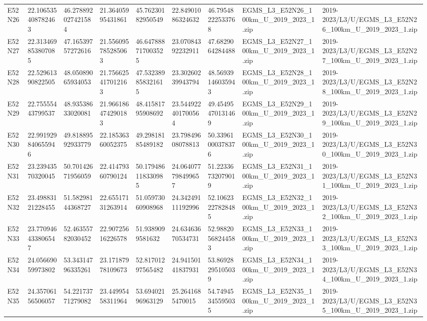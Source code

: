\begin{landscape}
\begin{longtable}{lllllllll}
E52N26 & 22.106535408782463 & 46.278892027421584 & 21.36405995431861 & 45.76230182950549 & 22.84901086324632 & 46.79548222533768 & EGMS\_L3\_E52N26\_100km\_U\_2019\_2023\_1.zip & 2019-2023/L3/U/EGMS\_L3\_E52N26\_100km\_U\_2019\_2023\_1.zip \\
E52N27 & 22.313469853807085 & 47.16539757272616 & 21.556095785285063 & 46.647888717003525 & 23.07084392232911 & 47.6829064284488 & EGMS\_L3\_E52N27\_100km\_U\_2019\_2023\_1.zip & 2019-2023/L3/U/EGMS\_L3\_E52N27\_100km\_U\_2019\_2023\_1.zip \\
E52N28 & 22.52961390822505 & 48.05089065934053 & 21.756625417012163 & 47.532389858321615 & 23.30260239943794 & 48.56939146035943 & EGMS\_L3\_E52N28\_100km\_U\_2019\_2023\_1.zip & 2019-2023/L3/U/EGMS\_L3\_E52N28\_100km\_U\_2019\_2023\_1.zip \\
E52N29 & 22.75555443799537 & 48.93538633020081 & 21.966186474290183 & 48.41581795908692 & 23.544922401700564 & 49.45495470131469 & EGMS\_L3\_E52N29\_100km\_U\_2019\_2023\_1.zip & 2019-2023/L3/U/EGMS\_L3\_E52N29\_100km\_U\_2019\_2023\_1.zip \\
E52N30 & 22.991929840655946 & 49.81889592933779 & 22.18536360052375 & 49.29818185489182 & 23.79849608078813 & 50.33961000378376 & EGMS\_L3\_E52N30\_100km\_U\_2019\_2023\_1.zip & 2019-2023/L3/U/EGMS\_L3\_E52N30\_100km\_U\_2019\_2023\_1.zip \\
E52N31 & 23.23943570320045 & 50.70142671956059 & 22.41479360790124 & 50.179486118330985 & 24.064077798499657 & 51.22336732079019 & EGMS\_L3\_E52N31\_100km\_U\_2019\_2023\_1.zip & 2019-2023/L3/U/EGMS\_L3\_E52N31\_100km\_U\_2019\_2023\_1.zip \\
E52N32 & 23.49883121228455 & 51.58298144368727 & 22.65517131263914 & 51.05973060908968 & 24.34249111192996 & 52.10623227828485 & EGMS\_L3\_E52N32\_100km\_U\_2019\_2023\_1.zip & 2019-2023/L3/U/EGMS\_L3\_E52N32\_100km\_U\_2019\_2023\_1.zip \\
E52N33 & 23.770946433806547 & 52.46355782030452 & 22.90725616226578 & 51.9389099581632 & 24.63463670534731 & 52.98820568244583 & EGMS\_L3\_E52N33\_100km\_U\_2019\_2023\_1.zip & 2019-2023/L3/U/EGMS\_L3\_E52N33\_100km\_U\_2019\_2023\_1.zip \\
E52N34 & 24.05669059973802 & 53.34314796335261 & 23.17187978109673 & 52.81701297565482 & 24.94150141837931 & 53.86928295105039 & EGMS\_L3\_E52N34\_100km\_U\_2019\_2023\_1.zip & 2019-2023/L3/U/EGMS\_L3\_E52N34\_100km\_U\_2019\_2023\_1.zip \\
E52N35 & 24.35706156506057 & 54.22173771279082 & 23.44995458311964 & 53.69402196963129 & 25.2641685470015 & 54.74945345595035 & EGMS\_L3\_E52N35\_100km\_U\_2019\_2023\_1.zip & 2019-2023/L3/U/EGMS\_L3\_E52N35\_100km\_U\_2019\_2023\_1.zip \\

\end{longtable}
\end{landscape}
